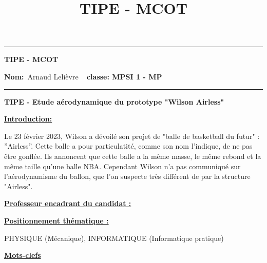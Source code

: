 \documentclass{article}
\title{TIPE - MCOT}
\begin{document}
\begin{center}
  \hrule
	\vspace{.4cm}
	{\textbf{\large TIPE - MCOT}}
\end{center}

{\textbf{Nom:}\ Arnaud Lelièvre \hspace{\fill} \vspace{0.5cm}}
{\textbf{}\  \hspace{\fill} \vspace{0.5cm}}
{\textbf{classe: MPSI 1 - MP }\ \hspace{\fill}}
\hrule
\date{}

\vspace{1cm}

\begin{center}
\textbf{\large TIPE - Etude aérodynamique du prototype "Wilson Airless"}
\end{center}

\vspace{0.6cm}

\underline{\Large{\textbf{Introduction:}}} \\

\vspace{0.6cm}

Le 23 février 2023, Wilson a dévoilé son projet de "balle de basketball du futur" : ”Airless”. Cette balle a pour particulatité, comme son nom l’indique, de ne pas être gonflée. Ils annoncent que cette balle a la même masse, le même rebond et la même taille qu'une balle NBA. Cependant Wilson n’a pas communiqué sur l’aérodynamisme du ballon, que l’on suspecte très différent de par la structure "Airless".

\vspace{0.6cm}

\underline{\Large{\textbf{Professeur encadrant du candidat :}}}\\

\vspace{0.6cm}

\underline{\Large{\textbf{Positionnement thématique :}}}\\

\vspace{0.6cm}

PHYSIQUE (Mécanique), INFORMATIQUE (Informatique pratique)

\vspace{0.6cm}

\underline{\Large{\textbf{Mots-clefs}}}\\
\end{document}
